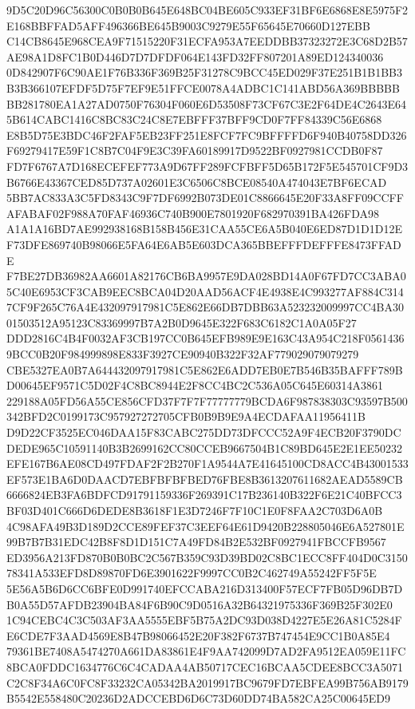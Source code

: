 \documentclass[UTF8,fontset=fandol,zihao=-4,a4paper]{ctexart}
\begin{document}
{{9D5C20D96C56300C0B0B0B645E648BC04BE605C933EF31BF6E6868E8E5975F2E168BBFFAD5AFF496366BE645B9003C9279E55F65645E70660D127EBB
C14CB8645E968CEA9F71515220F31ECFA953A7EEDDBB37323272E3C68D2B57AE98A1D8FC1B0D446D7D7DFDF064E143FD32FF807201A89ED124340036
0D842907F6C90AE1F76B336F369B25F31278C9BCC45ED029F37E251B1B1BB3B3B366107EFDF5D75F7EF9E51FFCE0078A4ADBC1C141ABD56A369BBBBB
BB281780EA1A27AD0750F76304F060E6D53508F73CF67C3E2F64DE4C2643E645B614CABC1416C8BC83C24C8E7EBFFF37BFF9CD0F7FF84339C56E6868
E8B5D75E3BDC46F2FAF5EB23FF251E8FCF7FC9BFFFFD6F940B40758DD326F69279417E59F1C8B7C04F9E3C39FA60189917D9522BF0927981CCDB0F87
FD7F6767A7D168ECEFEF773A9D67FF289FCFBFF5D65B172F5E545701CF9D3B6766E43367CED85D737A02601E3C6506C8BCE08540A474043E7BF6ECAD
5BB7AC833A3C5FD8343C9F7DF6992B073DE01C8866645E20F33A8FF09CCFFAFABAF02F988A70FAF46936C740B900E7801920F682970391BA426FDA98
A1A1A16BD7AE992938168B158B456E31CAA55CE6A5B040E6ED87D1D1D12EF73DFE869740B98066E5FA64E6AB5E603DCA365BBEFFFDEFFFE8473FFADE
F7BE27DB36982AA6601A82176CB6BA9957E9DA028BD14A0F67FD7CC3ABA05C40E6953CF3CAB9EEC8BCA04D20AAD56ACF4E4938E4C993277AF884C314
7CF9F265C76A4E432097917981C5E862E66DB7DBB63A523232009997CC4BA3001503512A95123C83369997B7A2B0D9645E322F683C6182C1A0A05F27
DDD2816C4B4F0032AF3CB197CC0B645EFB989E9E163C43A954C218F05614369BCC0B20F984999898E833F3927CE90940B322F32AF779029079079279
CBE5327EA0B7A644432097917981C5E862E6ADD7EB0E7B546B35BAFFF789BD00645EF9571C5D02F4C8BC8944E2F8CC4BC2C536A05C645E60314A3861
229188A05FD56A55CE856CFD37F7F7F77777779BCDA6F987838303C93597B500342BFD2C0199173C957927272705CFB0B9B9E9A4ECDAFAA11956411B
D9D22CF3525EC046DAA15F83CABC275DD73DFCCC52A9F4ECB20F3790DCDEDE965C10591140B3B2699162CC80CCEB9667504B1C89BD645E2E1EE50232
EFE167B6AE08CD497FDAF2F2B270F1A9544A7E41645100CD8ACC4B43001533EF573E1BA6D0DAACD7EBFBFBFBED76FBE8B3613207611682AEAD5589CB
6666824EB3FA6BDFCD91791159336F269391C17B236140B322F6E21C40BFCC3BF03D401C666D6DEDE8B3618F1E3D7246F7F10C1E0F8FAA2C703D6A0B
4C98AFA49B3D189D2CCE89FEF37C3EEF64E61D9420B228805046E6A527801E99B7B7B31EDC42B8F8D1D151C7A49FD84B2E532BF0927941FBCCFB9567
ED3956A213FD870B0B0BC2C567B359C93D39BD02C8BC1ECC8FF404D0C315078341A533EFD8D89870FD6E3901622F9997CC0B2C462749A55242FF5F5E
5E56A5B6D6CC6BFE0D991740EFCCABA216D313400F57ECF7FB05D96DB7DB0A55D57AFDB23904BA84F6B90C9D0516A32B64321975336F369B25F302E0
1C94CEBC4C3C503AF3AA5555EBF5B75A2DC93D038D4227E5E26A81C5284FE6CDE7F3AAD4569E8B47B98066452E20F382F6737B747454E9CC1B0A85E4
79361BE7408A5474270A661DA83861E4F9AA742099D7AD2FA9512EA059E11FC8BCA0FDDC1634776C6C4CADAA4AB50717CEC16BCAA5CDEE8BCC3A5071
C2C8F34A6C0FC8F33232CA05342BA2019917BC9679FD7EBFEA99B756AB9179B5542E558480C20236D2ADCCEBD6D6C73D60DD74BA582CA25C00645ED9
}}
\end{document}
